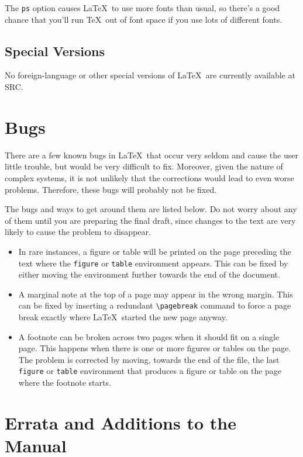 The {\tt ps} option causes \LaTeX\ to use more fonts than usual,
so there's a good chance that you'll run \TeX\ out of font
space if you use lots of different fonts.
  
\subsection{Special Versions}

No foreign-language or other special versions of \LaTeX\
are currently available at SRC.


\section{Bugs}

There are a few known bugs in \LaTeX\ that occur very seldom and
cause the user little trouble, but would be very difficult to fix.
Moreover, given the nature of complex systems, it is not unlikely that
the corrections would lead to even worse problems.  Therefore, these
bugs will probably not be fixed.  

The bugs and ways to get around them are listed below.  Do not worry
about any of them until you are preparing the final draft, since
changes to the text are very likely to cause the problem to disappear.
\begin{itemize}
\item In rare instances, a figure or table will be printed on the page
preceding the text where the {\tt figure} or {\tt table} environment
appears.  This can be fixed by either moving the environment further
towards the end of the document. 

\item A marginal note at the top of a page may appear in the wrong
margin.  This can be fixed by inserting a redundant \verb|\pagebreak|
command to force a page break exactly where \LaTeX\ started the new
page anyway.

\item A footnote can be broken across two pages when it should fit on a
single page.  This happens when there is one or more figures or tables
on the page.  The problem is corrected by moving, towards the end of the
file, the last {\tt figure} or {\tt table} environment that produces a
figure or table on the page where the footnote starts.
\end{itemize}


\section{Errata and Additions to the Manual}




